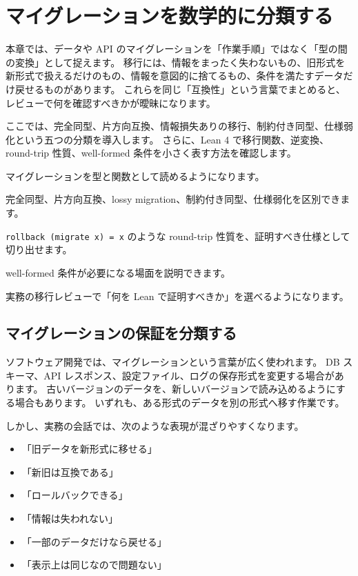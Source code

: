 \chapter{マイグレーションを数学的に分類する}
\label{chap:ch27-migration-classification}

\begin{chapterabstract}
本章では、データや API のマイグレーションを「作業手順」ではなく「型の間の変換」として捉えます。
移行には、情報をまったく失わないもの、旧形式を新形式で扱えるだけのもの、情報を意図的に捨てるもの、条件を満たすデータだけ戻せるものがあります。
これらを同じ「互換性」という言葉でまとめると、レビューで何を確認すべきかが曖昧になります。

ここでは、完全同型、片方向互換、情報損失ありの移行、制約付き同型、仕様弱化という五つの分類を導入します。
さらに、Lean 4 で移行関数、逆変換、round-trip 性質、well-formed 条件を小さく表す方法を確認します。
\end{chapterabstract}

\begin{learninggoals}
\item マイグレーションを型と関数として読めるようになります。
\item 完全同型、片方向互換、lossy migration、制約付き同型、仕様弱化を区別できます。
\item \texttt{rollback (migrate x) = x} のような round-trip 性質を、証明すべき仕様として切り出せます。
\item well-formed 条件が必要になる場面を説明できます。
\item 実務の移行レビューで「何を Lean で証明すべきか」を選べるようになります。
\end{learninggoals}

\section{マイグレーションの保証を分類する}

ソフトウェア開発では、マイグレーションという言葉が広く使われます。
DB スキーマ、API レスポンス、設定ファイル、ログの保存形式を変更する場合があります。
古いバージョンのデータを、新しいバージョンで読み込めるようにする場合もあります。
いずれも、ある形式のデータを別の形式へ移す作業です。

しかし、実務の会話では、次のような表現が混ざりやすくなります。

\begin{itemize}
\item 「旧データを新形式に移せる」
\item 「新旧は互換である」
\item 「ロールバックできる」
\item 「情報は失われない」
\item 「一部のデータだけなら戻せる」
\item 「表示上は同じなので問題ない」
\end{itemize}

